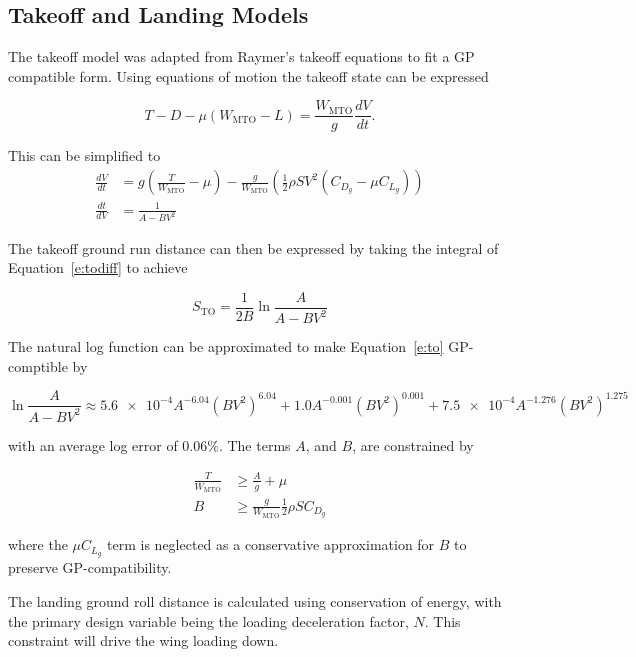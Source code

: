 \documentclass[]{aiaa-tc}%
\begin{document}
\subsection{Takeoff and Landing Models}

The takeoff model was adapted from Raymer's takeoff equations to fit a GP compatible form.  Using equations of motion the takeoff state can be expressed

\begin{equation}
    T - D - \mu(W_{\mathrm{MTO}} - L) = \frac{W_{\mathrm{MTO}}}{g} \frac{dV}{dt}.
\end{equation}

This can be simplified to 
\begin{align}
    \frac{dV}{dt} &= g \left( \frac{T}{W_{\mathrm{MTO}}} - \mu \right) - \frac{g}{W_{\mathrm{MTO}}} \left( \frac{1}{2} \rho S V^2 (C_{D_g} - \mu C_{L_g})\right) \\
    \label{e:todiff}
    \frac{dt}{dV} &= \frac{1}{A-BV^2}
\end{align}

The takeoff ground run distance can then be expressed by taking the integral of Equation~\ref{e:todiff} to achieve

\begin{equation}
    \label{e:to}
    S_{\mathrm{TO}} = \frac{1}{2B} \ln{\frac{A}{A-BV^2}} 
\end{equation}

The natural log function can be approximated to make Equation~\ref{e:to} GP-comptible by 

\begin{equation}
    \ln{\frac{A}{A-BV^2}} \approx \num{5.6e-4} A^{-6.04} (BV^2)^{6.04} + 1.0 A^{-0.001} (BV^2)^{0.001} + \num{7.5e-4} A^{-1.276} (BV^2)^{1.275}
\end{equation}

with an average log error of 0.06\%.  The terms $A$, and $B$, are constrained by

\begin{align}
    \frac{T}{W_{\mathrm{MTO}}} &\geq \frac{A}{g} + \mu \\
    B &\geq \frac{g}{W_{\mathrm{MTO}}} \frac{1}{2} \rho S C_{D_g}
\end{align}

where the $\mu C_{L_g}$ term is neglected as a conservative approximation for $B$ to preserve GP-compatibility. 

The landing ground roll distance is calculated using conservation of energy, with the primary design variable being the loading deceleration factor, $N$.
This constraint will drive the wing loading down. 
\end{document}
